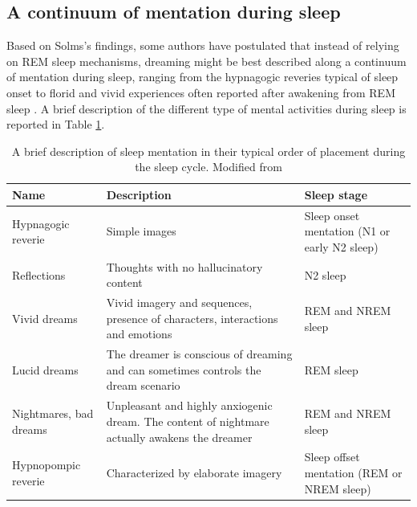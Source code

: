 \subsection{A continuum of mentation during sleep}
\label{sec:dream-research:link:continuum}

Based on Solms’s findings, some authors have postulated that instead of relying on REM sleep mechanisms, dreaming might be best described along a continuum of mentation during sleep, ranging from the hypnagogic reveries typical of sleep onset to florid and vivid experiences often reported after awakening from REM sleep \citep{schwartz_dreaming:_2005}. A brief description of the different type of mental activities during sleep is reported in Table \ref{tab:intro:continuum}.

\begin{table}[htb]
	\caption[A brief description of sleep mentation in their typical order of placement during the sleep cycle]{A brief description of sleep mentation in their typical order of placement during the sleep cycle. Modified from \citet{de_koninck_sleep_2012}}
	\label{tab:intro:continuum}
	\begin{tabularx}{\textwidth}{lXX}
	\toprule
	Name                  		   & Description                                                                          		   & Sleep stage                         			\\ \midrule
	Hypnagogic reverie             & Simple images                                                                                 & Sleep onset mentation (N1 or early N2 sleep) 	\\
	Reflections                    & Thoughts with no hallucinatory content                                                        & N2 sleep                                     	\\
	Vivid dreams                   & Vivid imagery and sequences, presence of characters, interactions and emotions                & REM and NREM sleep                           	\\
	Lucid dreams                   & The dreamer is conscious of dreaming and can sometimes controls the dream scenario            & REM sleep                                    	\\
	Nightmares, bad dreams 	   	   & Unpleasant and highly anxiogenic dream. The content of nightmare actually awakens the dreamer & REM and NREM sleep                             \\
	Hypnopompic reverie            & Characterized by elaborate imagery                                                            & Sleep offset mentation (REM or NREM sleep)   	\\ \bottomrule
	\end{tabularx}
\end{table}


